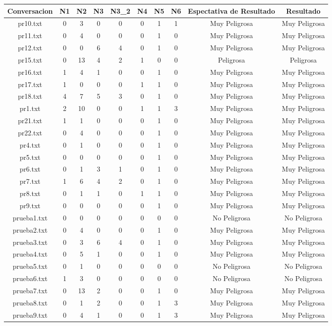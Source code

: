 \begin{table}[h]
\begin{tabular}{|c|c|c|c|c|c|c|c|c|c|}
\hline
Conversacion & N1 & N2 & N3 & N3\_2 & N4 & N5 & N6 & Espectativa de Resultado & Resultado \\

\hline
pr10.txt &  0 & 3 & 0 & 0 & 0 & 1 & 1 & Muy Peligrosa & Muy Peligrosa \\
\hline
pr11.txt &  0 & 4 & 0 & 0 & 0 & 1 & 0 & Muy Peligrosa & Muy Peligrosa \\
\hline
pr12.txt &  0 & 0 & 6 & 4 & 0 & 1 & 0 & Muy Peligrosa & Muy Peligrosa \\
\hline
pr15.txt &  0 & 13 & 4 & 2 & 1 & 0 & 0 & Peligrosa & Peligrosa \\
\hline
pr16.txt &  1& 4 & 1 & 0 & 0 & 1 & 0 & Muy Peligrosa & Muy Peligrosa \\
\hline
pr17.txt &  1 & 0 & 0 & 0 & 1 & 1 & 0 & Muy Peligrosa & Muy Peligrosa \\
\hline
pr18.txt &  4 & 7 & 5 & 3 & 0 & 1 & 0 & Muy Peligrosa & Muy Peligrosa \\
\hline
pr1.txt &  2 & 10 & 0 & 0 & 1 & 1 & 3 & Muy Peligrosa & Muy Peligrosa \\
\hline
pr21.txt &  1 & 1 & 0 & 0 & 0 & 1 & 0 & Muy Peligrosa & Muy Peligrosa \\
\hline
pr22.txt &  0 & 4 & 0 & 0 & 0 & 1 & 0& Muy Peligrosa & Muy Peligrosa \\
\hline
pr4.txt &  0 & 1 & 0 & 0 & 0 & 1 & 0 & Muy Peligrosa & Muy Peligrosa \\
\hline
pr5.txt &  0 & 0 & 0 & 0 & 0 & 1 & 0 & Muy Peligrosa & Muy Peligrosa \\
\hline
pr6.txt & 0 & 1 & 3 & 1 & 0 & 1 & 0 & Muy Peligrosa & Muy Peligrosa \\
\hline
pr7.txt &  1 & 6 & 4 & 2 & 0 & 1 & 0 & Muy Peligrosa & Muy Peligrosa \\
\hline
pr8.txt &  0 & 1 & 1 & 0 & 1 & 1 & 0 & Muy Peligrosa & Muy Peligrosa \\
\hline
pr9.txt &  0 & 0 & 0 & 0 & 0 & 1 & 0 & Muy Peligrosa & Muy Peligrosa \\
\hline
prueba1.txt &  0 & 0 & 0 & 0 & 0 & 0 & 0 & No Peligrosa & No Peligrosa \\
\hline
prueba2.txt &  0 & 4 & 0 & 0 & 0 & 1 & 0 & Muy Peligrosa & Muy Peligrosa \\
\hline
prueba3.txt  &  0 & 3& 6 & 4 & 0 & 1 & 0 & Muy Peligrosa & Muy Peligrosa \\
\hline
prueba4.txt  &  0 & 5 & 1 & 0 & 0 & 1 & 0 & Muy Peligrosa & Muy Peligrosa \\
\hline
prueba5.txt &  0 & 1 & 0 & 0 & 0 & 0 & 0 & No Peligrosa  & No Peligrosa \\
\hline
prueba6.txt &  1 & 3 & 0 & 0 & 0 & 0& 0 & No Peligrosa & No Peligrosa \\
\hline
prueba7.txt &  0 & 13 & 2 & 0 & 0 & 1 & 0 & Muy Peligrosa & Muy Peligrosa \\
\hline
prueba8.txt &  0 & 1 & 2 & 0 & 0 & 1 & 3 & Muy Peligrosa & Muy Peligrosa \\ 
\hline
prueba9.txt &  0 & 4 & 1 & 0 & 0 & 1 & 3 & Muy Peligrosa & Muy Peligrosa \\
\hline


\end{tabular}
\end{table}
